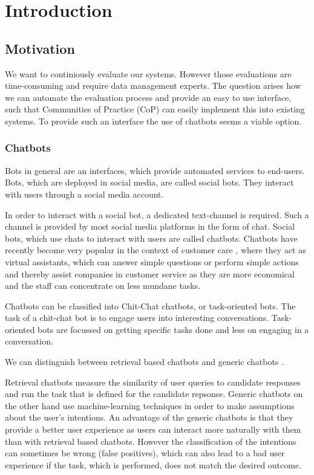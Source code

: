 \chapter{Introduction}

\section{Motivation}
We want to continiously evaluate our systems. However those evaluations are time-consuming and require data management experts. The question arises how we can automate the evaluation process and provide an easy to use interface, such that Communities of Practice (CoP) can easily implement this into existing systems.
To provide such an interface the use of chatbots seems a viable option.

\subsection{Chatbots}
Bots in general are an interfaces, which provide automated services to end-users. Bots, which are deployed in social media, are called social bots. They interact with users through a social media account.

In order to interact with a social bot, a dedicated text-channel is required. Such a channel is provided by most social media platforms in the form of chat. Social bots, which use chats to interact with users are called chatbots. Chatbots have recently become very popular in the context of customer care \cite{CHW*17}, where they act as virtual assistants, which can answer simple questions or perform simple actions and thereby assist companies in customer service as they are more economical and the staff can concentrate on less mundane tasks.

Chatbots can be classified into Chit-Chat chatbots, or task-oriented bots. The task of a chit-chat bot is to engage users into interesting conversations. Task-oriented bots are focussed on getting specific tasks done and less on engaging in a conversation.

We can distinguish between retrieval based chatbots and generic chatbots \cite{NLKl19}.

Retrieval chatbots measure the similarity of user queries to candidate responses and run the task that is defined for the candidate repsonse. Generic chatbots on the other hand use machine-learning techniques in order to make assumptions about the user's intentions. An advantage of the generic chatbots is that they provide a better user experience as users can interact more naturally with them than with retrieval based chatbots. However the classification of the intentions can sometimes be wrong (false positives), which can also lead to a bad user experience if the task, which is performed, does not match the desired outcome.

